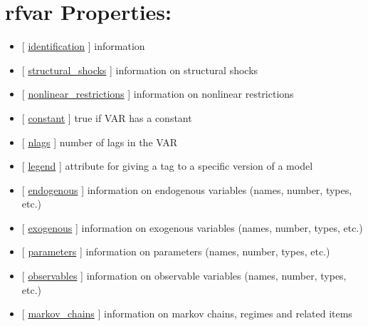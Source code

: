 \documentclass[letterpaper,10pt,english]{sphinxmanual}
\begin{document}
\section{rfvar Properties:}
\label{classes/models/@rfvar/rfvar:rfvar-properties}\begin{itemize}
\item {} 
{[} {\hyperref[classes/models/@rfvar/rfvar:identification]{identification}} {]} information

\item {} 
{[} {\hyperref[classes/models/@rfvar/rfvar:structural-shocks]{structural\_shocks}} {]}   information on structural shocks

\item {} 
{[} {\hyperref[classes/models/@rfvar/rfvar:nonlinear-restrictions]{nonlinear\_restrictions}} {]}   information on nonlinear restrictions

\item {} 
{[} {\hyperref[classes/models/@rfvar/rfvar:constant]{constant}} {]}   true if VAR has a constant

\item {} 
{[} {\hyperref[classes/models/@rfvar/rfvar:nlags]{nlags}} {]}   number of lags in the VAR

\item {} 
{[} {\hyperref[classes/models/@rfvar/rfvar:legend]{legend}} {]}   attribute for giving a tag to a specific version of a model

\item {} 
{[} {\hyperref[classes/models/@rfvar/rfvar:endogenous]{endogenous}} {]}   information on endogenous variables (names, number, types, etc.)

\item {} 
{[} {\hyperref[classes/models/@rfvar/rfvar:exogenous]{exogenous}} {]}   information on exogenous variables (names, number, types, etc.)

\item {} 
{[} {\hyperref[classes/models/@rfvar/rfvar:parameters]{parameters}} {]}   information on parameters (names, number, types, etc.)

\item {} 
{[} {\hyperref[classes/models/@rfvar/rfvar:observables]{observables}} {]}   information on observable variables (names, number, types, etc.)

\item {} 
{[} {\hyperref[classes/models/@rfvar/rfvar:markov-chains]{markov\_chains}} {]}   information on markov chains, regimes and related items


\end{itemize}
\end{document}
